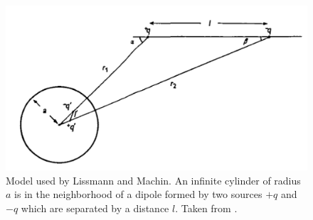 \begin{figure}
\centering
\includegraphics[width=\textwidth]{intro/figures/dipole_Lissmann}
\caption{Model used by Lissmann and Machin. An infinite cylinder of radius
$a$ is in the neighborhood of a dipole formed by two sources $+q$
and $-q$ which are separated by a distance $l$. Taken from \cite{lissmann1958mechanism}.
\label{fig:modele_lissmann}}
\end{figure}


